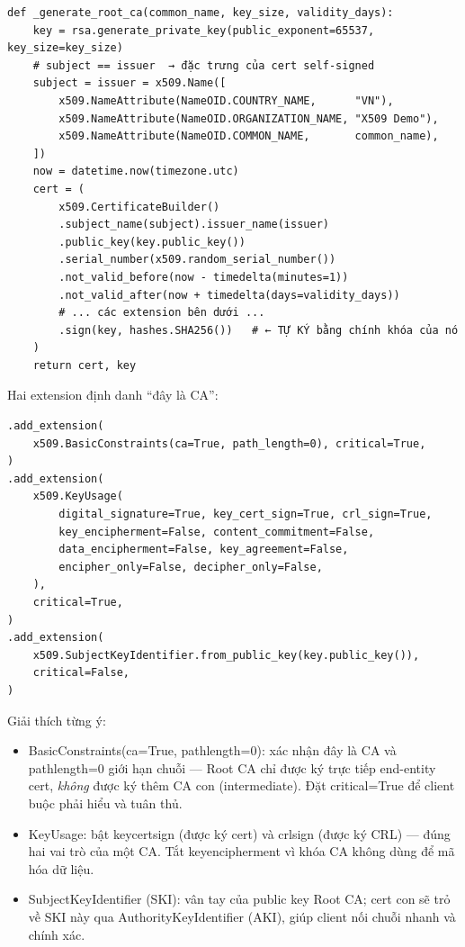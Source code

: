 \documentclass[12pt,a4paper]{article}
\newcommand{\code}[1]{{\ttfamily\small\def\_{\textunderscore\discretionary{}{}{}}#1}}
\begin{document}
\begin{Verbatim}
def _generate_root_ca(common_name, key_size, validity_days):
    key = rsa.generate_private_key(public_exponent=65537, key_size=key_size)
    # subject == issuer  → đặc trưng của cert self-signed
    subject = issuer = x509.Name([
        x509.NameAttribute(NameOID.COUNTRY_NAME,      "VN"),
        x509.NameAttribute(NameOID.ORGANIZATION_NAME, "X509 Demo"),
        x509.NameAttribute(NameOID.COMMON_NAME,       common_name),
    ])
    now = datetime.now(timezone.utc)
    cert = (
        x509.CertificateBuilder()
        .subject_name(subject).issuer_name(issuer)
        .public_key(key.public_key())
        .serial_number(x509.random_serial_number())
        .not_valid_before(now - timedelta(minutes=1))
        .not_valid_after(now + timedelta(days=validity_days))
        # ... các extension bên dưới ...
        .sign(key, hashes.SHA256())   # ← TỰ KÝ bằng chính khóa của nó
    )
    return cert, key
\end{Verbatim}

Hai extension định danh \enquote{đây là CA}:

\begin{Verbatim}
.add_extension(
    x509.BasicConstraints(ca=True, path_length=0), critical=True,
)
.add_extension(
    x509.KeyUsage(
        digital_signature=True, key_cert_sign=True, crl_sign=True,
        key_encipherment=False, content_commitment=False,
        data_encipherment=False, key_agreement=False,
        encipher_only=False, decipher_only=False,
    ),
    critical=True,
)
.add_extension(
    x509.SubjectKeyIdentifier.from_public_key(key.public_key()),
    critical=False,
)
\end{Verbatim}

Giải thích từng ý:
\begin{itemize}
  \item \code{BasicConstraints(ca=True, path\_length=0)}: xác nhận đây là CA và
        \code{path\_length=0} giới hạn chuỗi — Root CA chỉ được ký trực tiếp
        end-entity cert, \emph{không} được ký thêm CA con (intermediate). Đặt
        \code{critical=True} để client buộc phải hiểu và tuân thủ.
  \item \code{KeyUsage}: bật \code{key\_cert\_sign} (được ký cert) và
        \code{crl\_sign} (được ký CRL) — đúng hai vai trò của một CA. Tắt
        \code{key\_encipherment} vì khóa CA không dùng để mã hóa dữ liệu.
  \item \code{SubjectKeyIdentifier} (SKI): vân tay của public key Root CA; cert
        con sẽ trỏ về SKI này qua \code{AuthorityKeyIdentifier} (AKI), giúp
        client nối chuỗi nhanh và chính xác.
\end{itemize}
\end{document}
